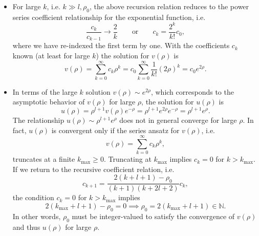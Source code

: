 \documentclass[11pt, a4paper]{article}
\newcommand{\eqtext}[1]{\qquad \text{#1} \qquad}
\begin{document}
\begin{itemize}
    \item For large $ k $, i.e. $ k \gg l, \rho_{0} $, the above recursion relation reduces to the power series coefficient relationship for the exponential function, i.e.
	\begin{equation*}
		\frac{c_{k}}{c_{k-1}} \to \frac{2}{k} \eqtext{or} c_{k} = \frac{2^{k}}{k!}c_{0},
	\end{equation*}
    where we have re-indexed the first term by one. With the coefficients $ c_{k} $ known (at least for large $ k $) the solution for $ v(\rho) $ is
	\begin{equation*}
		v(\rho) = \sum_{k = 0}^{\infty}c_{k}\rho^{k} = c_{0}\sum_{k = 0}^{\infty} \frac{1}{k!}(2\rho)^{k} = c_{0}e^{2\rho}.
	\end{equation*}
	
	\item In terms of the large $ k $ solution $ v(\rho) \sim e^{2\rho} $, which corresponds to the asymptotic behavior of $ v(\rho) $ for large $ \rho $, the solution for $ u(\rho) $ is
	\begin{equation*}
		u(\rho) = \rho^{l+1}v(\rho)e^{-\rho} = \rho^{l+1}e^{2\rho}e^{-\rho} =  \rho^{l+1}e^{\rho}.
	\end{equation*}
	The relationship $ u(\rho) \sim \rho^{l+1}e^{\rho} $ does not in general converge for large $ \rho $. In fact, $ u(\rho) $ is convergent only if the series ansatz for $ v(\rho) $, i.e.
	\begin{equation*}
		v(\rho) = \sum_{k = 0}^{\infty}c_{k}\rho^{k},
	\end{equation*}
	truncates at a finite $ k_{\text{max}} \geq 0 $. Truncating at $ k_{\text{max}} $ implies $ c_{k} = 0 $ for $ k > k_{\text{max}} $. If we return to the recursive coefficient relation, i.e.
	\begin{equation*}
		c_{k+1} = \frac{2(k+l+1)-\rho_{0}}{(k+1)(k+2l + 2)}c_{k},
	\end{equation*}
	the condition $ c_{k} = 0 $ for $ k > k_{\text{max}} $ implies
	\begin{equation*}
		2(k_{\text{max}} + l + 1) - \rho_{0} = 0 \implies \rho_{0} = 2(k_{\text{max}} + l + 1) \in \mathbb{N}.
	\end{equation*}
	In other words, $ \rho_{0} $ must be integer-valued to satisfy the convergence of $ v(\rho) $ and thus $ u(\rho) $ for large $ \rho $. 
	

\end{itemize}
\end{document}
